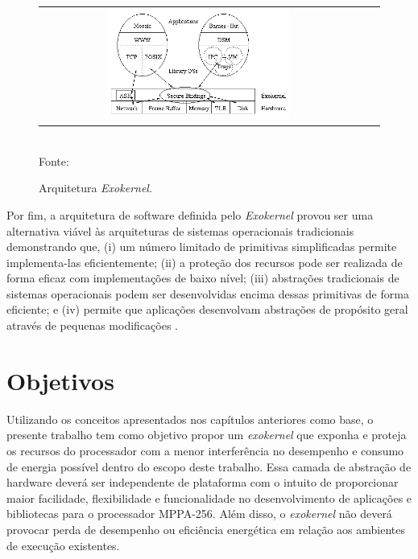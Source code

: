 \documentclass[
	12pt,				%
	openright,			%
	twoside,			%
	a4paper,			%
	english,			%
	brazil,				%
	]{abntex2}
\begin{document}
        \begin{figure}[t]
        	\begin{center}
            	\caption{Arquitetura \textit{Exokernel}.}
                   \label{figexokernel}
        		\begin{tabular}{ccc}
            	    \includegraphics[width=0.6\textwidth]{figs/exokernel.png} \\
        		\end{tabular}
                \vspace{1ex} \\
                Fonte: \cite{engler_exokernel:_1995}
            \end{center}
           \vspace{-2ex}
        \end{figure}
        
        Por fim, a arquitetura de software definida pelo \textit{Exokernel}
        provou ser uma alternativa viável às arquiteturas de sistemas
        operacionais tradicionais demonstrando que, 
        (i) um número limitado de primitivas simplificadas permite 
        implementa-las eficientemente; 
        (ii) a proteção dos recursos pode ser realizada de forma eficaz com
        implementações de baixo nível; (iii) abstrações tradicionais de
        sistemas operacionais podem ser desenvolvidas encima dessas
        primitivas de forma eficiente; e 
        (iv) permite que aplicações desenvolvam abstrações de propósito
        geral através de pequenas modificações \cite{engler_exokernel:_1995}.
    
\chapter{Objetivos}
\label{cap:objetivos}

    Utilizando os conceitos apresentados nos capítulos anteriores como base,
    o presente trabalho tem como objetivo propor um \textit{exokernel} que
    exponha e proteja os recursos do processador \mppa com a menor interferência
    no desempenho e consumo de energia possível dentro do escopo deste trabalho.
    Essa camada de abstração de hardware deverá ser independente de plataforma
    com o intuito de proporcionar maior facilidade, flexibilidade e funcionalidade no desenvolvimento de aplicações e bibliotecas para o
    processador MPPA-256. Além disso, o \textit{exokernel} não deverá provocar
    perda de desempenho ou eficiência energética em relação aos ambientes de
    execução existentes.
    
\end{document}

